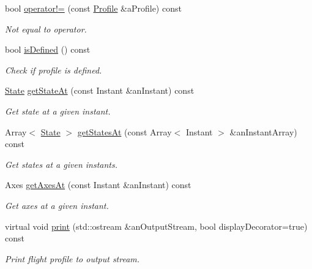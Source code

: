 \begin{DoxyCompactItemize}
bool \hyperlink{classlibrary_1_1astro_1_1flight_1_1_profile_a8e28294340c813a55b3aba76f816d67a}{operator!=} (const \hyperlink{classlibrary_1_1astro_1_1flight_1_1_profile}{Profile} \&a\+Profile) const
\begin{DoxyCompactList}\small\item\em Not equal to operator. \end{DoxyCompactList}\item 
bool \hyperlink{classlibrary_1_1astro_1_1flight_1_1_profile_a577366688800fc4b6f27eb11d64de772}{is\+Defined} () const
\begin{DoxyCompactList}\small\item\em Check if profile is defined. \end{DoxyCompactList}\item 
\hyperlink{classlibrary_1_1astro_1_1flight_1_1profile_1_1_state}{State} \hyperlink{classlibrary_1_1astro_1_1flight_1_1_profile_a7f266d44fe664c8dce12c28067ffdd94}{get\+State\+At} (const Instant \&an\+Instant) const
\begin{DoxyCompactList}\small\item\em Get state at a given instant. \end{DoxyCompactList}\item 
Array$<$ \hyperlink{classlibrary_1_1astro_1_1flight_1_1profile_1_1_state}{State} $>$ \hyperlink{classlibrary_1_1astro_1_1flight_1_1_profile_a20972a5b1104ed335d995c5a02db5db7}{get\+States\+At} (const Array$<$ Instant $>$ \&an\+Instant\+Array) const
\begin{DoxyCompactList}\small\item\em Get states at a given instants. \end{DoxyCompactList}\item 
Axes \hyperlink{classlibrary_1_1astro_1_1flight_1_1_profile_ae23fce614c9d1de3a4e8800eb4e3e03f}{get\+Axes\+At} (const Instant \&an\+Instant) const
\begin{DoxyCompactList}\small\item\em Get axes at a given instant. \end{DoxyCompactList}\item 
virtual void \hyperlink{classlibrary_1_1astro_1_1flight_1_1_profile_a8fadb2b70ff950b2a1f1c0996ced7ad2}{print} (std\+::ostream \&an\+Output\+Stream, bool display\+Decorator=true) const
\begin{DoxyCompactList}\small\item\em Print flight profile to output stream. \end{DoxyCompactList}\end{DoxyCompactItemize}
